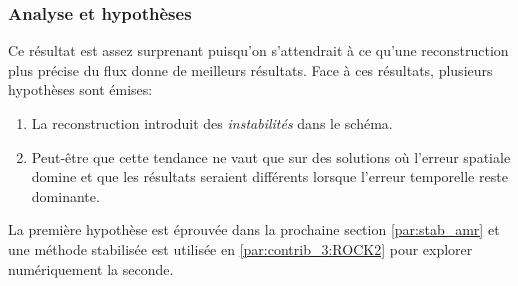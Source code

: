 \subsubsection{Analyse et hypothèses}
Ce résultat est assez surprenant puisqu'on s'attendrait à ce qu'une reconstruction plus précise du flux donne de meilleurs résultats.
Face à ces résultats, plusieurs hypothèses sont émises:
\begin{enumerate}
    \item La reconstruction introduit des \textit{instabilités} dans le schéma.
    \item Peut-être que cette tendance ne vaut que sur des solutions où l'erreur spatiale domine et que les résultats seraient différents lorsque l'erreur temporelle reste dominante.
\end{enumerate}
La première hypothèse est éprouvée dans la prochaine section \ref{par:stab_amr} et une méthode stabilisée est utilisée en \ref{par:contrib_3:ROCK2} pour explorer numériquement la seconde.